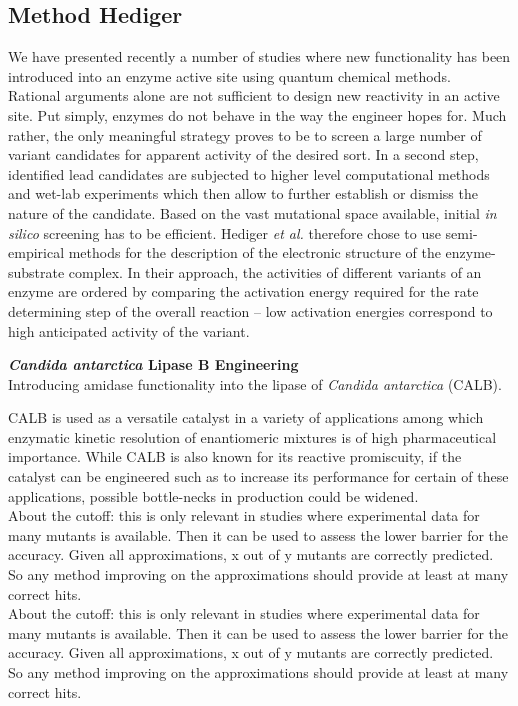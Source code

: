 \subsection{Method Hediger}
We have presented recently a number of studies where new functionality has been introduced into an enzyme active site using quantum chemical methods\cite{10.1371/journal.pone.0049849,hediger2013silico,hediger2013computational}.\\
Rational arguments alone are not sufficient to design new reactivity in an active site.
Put simply, enzymes do not behave in the way the engineer hopes for.
Much rather, the only meaningful strategy proves to be to screen a large number of variant candidates for apparent activity of the desired sort.
In a second step, identified lead candidates are subjected to higher level computational methods and wet-lab experiments which then allow to further establish or dismiss the nature of the candidate.
Based on the vast mutational space available, initial \textit{in silico} screening has to be efficient.
Hediger \textit{et al.} therefore chose to use semi-empirical methods for the description of the electronic structure of the enzyme-substrate complex.
In their approach, the activities of different variants of an enzyme are ordered by comparing the activation energy required for the rate determining step of the overall reaction -- low activation energies correspond to high anticipated activity of the variant.

\textbf{{\textit{Candida antarctica} Lipase B Engineering}}\\
Introducing amidase functionality into the lipase of \textit{Candida antarctica} (CALB).

CALB is used as a versatile catalyst in a variety of applications among which enzymatic kinetic resolution of enantiomeric mixtures is of high pharmaceutical importance\cite{gotor2006candida}.
While CALB is also known for its reactive promiscuity\cite{CBIC:CBIC200800318}, if the catalyst can be engineered such as to increase its performance for certain of these applications, possible bottle-necks in production could be widened.\\
About the cutoff: this is only relevant in studies where experimental data for many mutants is available.
Then it can be used to assess the lower barrier for the accuracy.
Given all approximations, x out of y mutants are correctly predicted.
So any method improving on the approximations should provide at least at many correct hits.\\
About the cutoff: this is only relevant in studies where experimental data for many mutants is available.
Then it can be used to assess the lower barrier for the accuracy.
Given all approximations, x out of y mutants are correctly predicted.
So any method improving on the approximations should provide at least at many correct hits.

